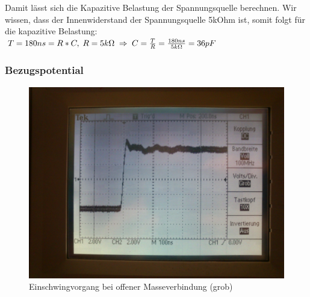 Damit lässt sich die Kapazitive Belastung der Spannungsquelle berechnen. Wir wissen, dass der Innenwiderstand der Spannungsquelle 5kOhm ist, somit folgt für die kapazitive Belastung:\\
$ T=180ns=R*C, \; R=5k\Omega \; \Rightarrow \; C=\frac{T}{R}=\frac{180ns}{5k\Omega}=36pF$

\subsubsection{Bezugspotential}
\begin{figure}[H]
	\centering
	\includegraphics[width=\linewidth]{versuch4/oszi/DSC_0340.JPG}
	\caption{Einschwingvorgang bei offener Masseverbindung (grob)}
\end{figure}

